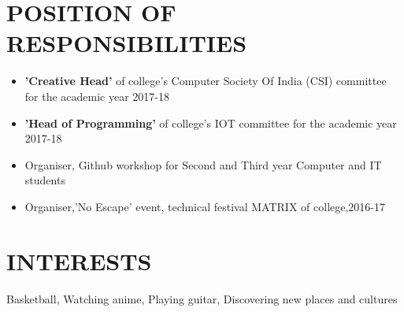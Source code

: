 \documentclass[11pt]{article} %
\newcommand{\NewPart}[1]{\section*{\uppercase{#1}}}
\begin{document}
\NewPart{  Position of Responsibilities}{}

\begin{itemize}
\itemsep-0.5em 
\item \textbf{'Creative Head'} of college’s Computer Society Of India (CSI) committee for the academic year 2017-18
\item \textbf{'Head of Programming'} of college’s IOT committee for the academic year 2017-18
\item Organiser, Github workshop for Second and Third year Computer and IT students 
\item Organiser,'No Escape' event, technical festival MATRIX of college,2016-17 
\end{itemize}

\NewPart{ Interests}{}
Basketball, Watching anime, Playing guitar, Discovering new places and cultures
\end{document}
